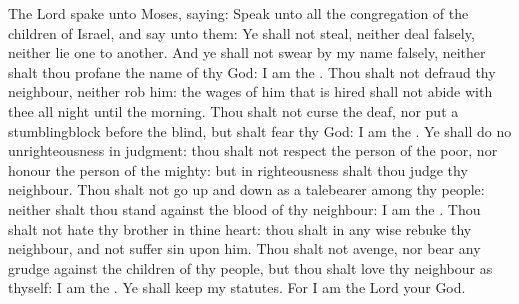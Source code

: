  The Lord spake unto Moses, saying: Speak unto all the congregation of the children of Israel, and say unto them: Ye shall not steal, neither deal falsely, neither lie one to another. And ye shall not swear by my name falsely, neither shalt thou profane the name of thy God: I am the . Thou shalt not defraud thy neighbour, neither rob him: the wages of him that is hired shall not abide with thee all night until the morning. Thou shalt not curse the deaf, nor put a stumblingblock before the blind, but shalt fear thy God: I am the . Ye shall do no unrighteousness in judgment: thou shalt not respect the person of the poor, nor honour the person of the mighty: but in righteousness shalt thou judge thy neighbour. Thou shalt not go up and down as a talebearer among thy people: neither shalt thou stand against the blood of thy neighbour: I am the . Thou shalt not hate thy brother in thine heart: thou shalt in any wise rebuke thy neighbour, and not suffer sin upon him. Thou shalt not avenge, nor bear any grudge against the children of thy people, but thou shalt love thy neighbour as thyself: I am the . Ye shall keep my statutes. For I am the Lord your God.


